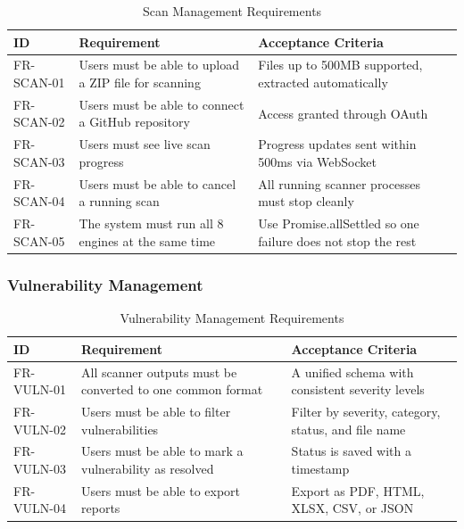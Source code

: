 \documentclass[12pt,a4paper]{report}
\begin{document}
\begin{table}[H]
\centering
\caption{Scan Management Requirements}
\label{tab:scan_requirements}
\begin{tabular}{|p{2cm}|p{5cm}|p{5cm}|}
\hline
\textbf{ID} & \textbf{Requirement} & \textbf{Acceptance Criteria} \\
\hline
FR-SCAN-01 & Users must be able to upload a ZIP file for scanning & Files up to 500MB supported, extracted automatically \\
\hline
FR-SCAN-02 & Users must be able to connect a GitHub repository & Access granted through OAuth \\
\hline
FR-SCAN-03 & Users must see live scan progress & Progress updates sent within 500ms via WebSocket \\
\hline
FR-SCAN-04 & Users must be able to cancel a running scan & All running scanner processes must stop cleanly \\
\hline
FR-SCAN-05 & The system must run all 8 engines at the same time & Use Promise.allSettled so one failure does not stop the rest \\
\hline
\end{tabular}
\end{table}

\subsubsection{Vulnerability Management}

\begin{table}[H]
\centering
\caption{Vulnerability Management Requirements}
\label{tab:vuln_requirements}
\begin{tabular}{|p{2cm}|p{5cm}|p{5cm}|}
\hline
\textbf{ID} & \textbf{Requirement} & \textbf{Acceptance Criteria} \\
\hline
FR-VULN-01 & All scanner outputs must be converted to one common format & A unified schema with consistent severity levels \\
\hline
FR-VULN-02 & Users must be able to filter vulnerabilities & Filter by severity, category, status, and file name \\
\hline
FR-VULN-03 & Users must be able to mark a vulnerability as resolved & Status is saved with a timestamp \\
\hline
FR-VULN-04 & Users must be able to export reports & Export as PDF, HTML, XLSX, CSV, or JSON \\
\hline
\end{tabular}
\end{table}
\end{document}
